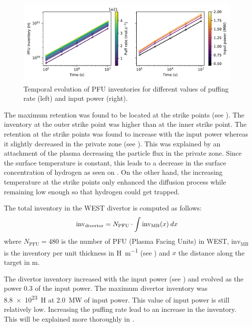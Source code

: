 \begin{figure}[h]
    \centering
    \includegraphics[width=0.8\linewidth]{Figures/Chapter4/WEST/inventory_vs_time_west.pdf}
    \caption{Temporal evolution of PFU inventories for different values of puffing rate (left) and input power (right).}
\end{figure}

The maximum retention was found to be located at the strike points (see ).
The inventory at the outer strike point was higher than at the inner strike point.
The retention at the strike points was found to increase with the input power whereas it slightly decreased in the private zone (see ).
This was explained by an attachment of the plasma decreasing the particle flux in the private zone.
Since the surface temperature is constant, this leads to a decrease in the surface concentration of hydrogen as seen on .
On the other hand, the increasing temperature at the strike points only enhanced the diffusion process while remaining low enough so that hydrogen could get trapped.

The total inventory in the WEST divertor is computed as follows:
\begin{equation}
    \mathrm{inv}_\mathrm{divertor} = N_\mathrm{PFU} \cdot \int \mathrm{inv}_\mathrm{MB}(x)\: dx
    \labeq{inventory WEST}
\end{equation}
where $N_\mathrm{PFU} = 480$ is the number of PFU (Plasma Facing Units) in WEST, $\mathrm{inv}_\mathrm{MB}$ is the inventory per unit thickness in \si{H.m^{-1}} (see ) and $x$ the distance along the target in \si{m}.

The divertor inventory increased with the input power (see ) and evolved as the power 0.3 of the input power.
The maximum divertor inventory was \SI{8.8e23}{H} at \SI{2.0}{MW} of input power.
This value of input power is still relatively low.
Increasing the puffing rate lead to an increase in the inventory.
This will be explained more thoroughly in .

